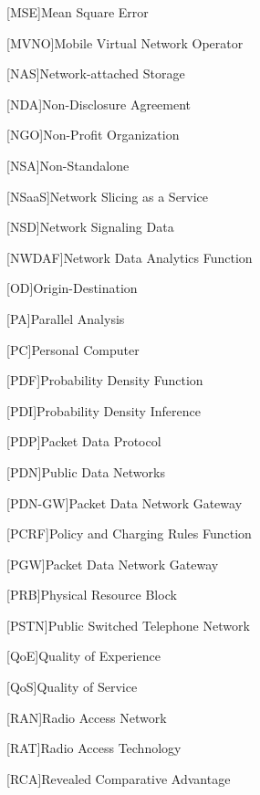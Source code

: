 \begin{acronym}[]
[MSE]{Mean Square Error}  

[MVNO]{Mobile Virtual Network Operator}

[NAS]{Network-attached Storage}

[NDA]{Non-Disclosure Agreement}

[NGO]{Non-Profit Organization}

[NSA]{Non-Standalone}

[NSaaS]{Network Slicing as a Service}

[NSD]{Network Signaling Data}

[NWDAF]{Network Data Analytics Function}

[OD]{Origin-Destination}

[PA]{Parallel Analysis}

[PC]{Personal Computer}

[PDF]{Probability Density Function}

[PDI]{Probability Density Inference}

[PDP]{Packet Data Protocol}

[PDN]{Public Data Networks}

[PDN-GW]{Packet Data Network Gateway}

[PCRF]{Policy and Charging Rules Function}

[PGW]{Packet Data Network Gateway}

[PRB]{Physical Resource Block}

[PSTN]{Public Switched Telephone Network}

[QoE]{Quality of Experience}

[QoS]{Quality of Service}



[RAN]{Radio Access Network}

[RAT]{Radio Access Technology}

[RCA]{Revealed Comparative Advantage}


\end{acronym}
